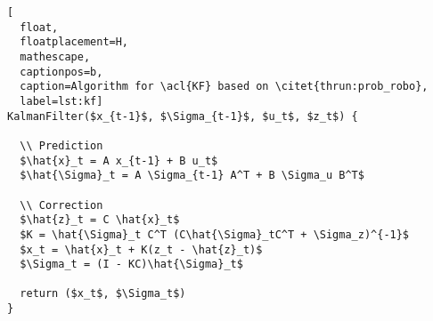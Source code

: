 \begin{lstlisting}[
  float,
  floatplacement=H,
  mathescape,
  captionpos=b,
  caption=Algorithm for \acl{KF} based on \citet{thrun:prob_robo},
  label=lst:kf]
KalmanFilter($x_{t-1}$, $\Sigma_{t-1}$, $u_t$, $z_t$) {

  \\ Prediction
  $\hat{x}_t = A x_{t-1} + B u_t$
  $\hat{\Sigma}_t = A \Sigma_{t-1} A^T + B \Sigma_u B^T$

  \\ Correction
  $\hat{z}_t = C \hat{x}_t$
  $K = \hat{\Sigma}_t C^T (C\hat{\Sigma}_tC^T + \Sigma_z)^{-1}$
  $x_t = \hat{x}_t + K(z_t - \hat{z}_t)$
  $\Sigma_t = (I - KC)\hat{\Sigma}_t$

  return ($x_t$, $\Sigma_t$)
}
\end{lstlisting}
